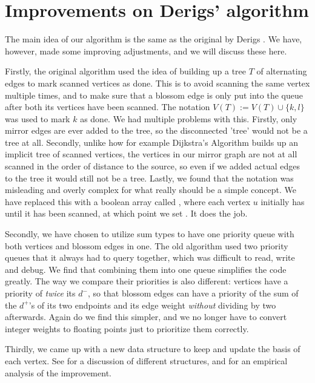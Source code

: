\section{Improvements on Derigs' algorithm}
The main idea of our algorithm is the same as the original by Derigs \cite{source:derigs_shortest_odd_path}. We have, however, made some improving adjustments, and we will discuss these here.

Firstly, the original algorithm used the idea of building up a tree $T$ of alternating edges to mark scanned vertices as done. This is to avoid scanning the same vertex multiple times, and to make sure that a blossom edge is only put into the queue after both its vertices have been scanned. The notation $V(T) := V(T) \cup \{k,l\}$ was used to mark $k$ as done. We had multiple problems with this. Firstly, only mirror edges are ever added to the tree, so the disconnected 'tree' would not be a tree at all. Secondly, unlike how for example Dijkstra's Algorithm builds up an implicit tree of scanned vertices, the vertices in our mirror graph are not at all scanned in the order of distance to the source, so even if we added actual edges to the tree it would still not be a tree. Lastly, we found that the notation was misleading and overly complex for what really should be a simple concept. We have replaced this with a boolean array called , where each vertex $u$ initially has  until it has been scanned, at which point we set . It does the job.

Secondly, we have chosen to utilize sum types to have one priority queue with both vertices and blossom edges in one. The old algorithm used two priority queues that it always had to query together, which was difficult to read, write and debug. We find that combining them into one queue simplifies the code greatly. The way we compare their priorities is also different: vertices have a priority of \emph{twice} its $d^-$, so that blossom edges can have a priority of the sum of the $d^+$'s of its two endpoints and its edge weight \emph{without} dividing by two afterwards. Again do we find this simpler, and we no longer have to convert integer weights to floating points just to prioritize them correctly.

Thirdly, we came up with a new data structure to keep and update the basis of each vertex. See  for a discussion of different structures, and  for an empirical analysis of the improvement.
